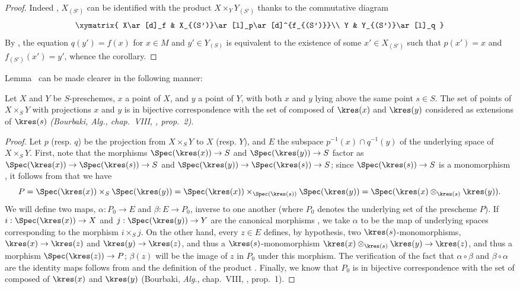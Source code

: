 \begin{proof}
Indeed , $X_{(S')}$ can be identified with the product $X\times_Y Y_{(S')}$ thanks to the commutative diagram
\[
  \xymatrix{
    X\ar[d]_f &
    X_{(S')}\ar[l]_p\ar[d]^{f_{(S')}}\\
    Y &
    Y_{(S')}\ar[l]_q
  }
\]
By , the equation $q(y')=f(x)$ for $x\in M$ and $y'\in Y_{(S)}$ is equivalent to the existence of some $x'\in X_{(S')}$ such that $p(x')=x$ and $f_{(S')}(x')=y'$, whence the corollary.
\end{proof}

Lemma~ can be made clearer in the following manner:
\begin{proposition}[3.4.9]
\label{I.3.4.9}
Let $X$ and $Y$ be $S$-preschemes, $x$ a point of $X$, and $y$ a point of $Y$, with both $x$ and $y$ lying above the same point $s\in S$.
The set of points of $X\times_S Y$ with projections $x$ and $y$ is in bijective correspondence with the set of  composed of $\kres(x)$ and $\kres(y)$ considered as extensions of $\kres(s)$ \emph{(Bourbaki, \emph{Alg.}, chap.~VIII, , prop.~2)}.
\end{proposition}

\begin{proof}
Let $p$ (resp. $q$) be the projection from $X\times_S Y$ to $X$ (resp. $Y$), and $E$ the subspace $p^{-1}(x)\cap q^{-1}(y)$ of the underlying space of $X\times_S Y$.
First, note that the morphisms $\Spec(\kres(x))\to S$ and $\Spec(\kres(y))\to S$ factor as $\Spec(\kres(x))\to\Spec(\kres(s))\to S$ and $\Spec(\kres(y))\to\Spec(\kres(s))\to S$; since $\Spec(\kres(s))\to S$ is a monomorphism , it follows from  that we have
\[
  P=\Spec(\kres(x))\times_S\Spec(\kres(y))=\Spec(\kres(x))\times_{\Spec(\kres(s))}\Spec(\kres(y))=\Spec(\kres(x)\otimes_{\kres(s)}\kres(y)).
\]
We will define two maps, $\alpha:P_0\to E$ and $\beta:E\to P_0$, inverse to one another (where $P_0$ denotes the underlying set of the prescheme $P$).
If $i:\Spec(\kres(x))\to X$ and $j:\Spec(\kres(y))\to Y$ are the canonical morphisms , we take $\alpha$ to be the map of underlying spaces corresponding to the morphism $i\times_S j$.
On the other hand, every $z\in E$ defines, by hypothesis, two $\kres(s)$-monomorphisms, $\kres(x)\to\kres(z)$ and $\kres(y)\to\kres(z)$, and thus a $\kres(s)$-monomorphism $\kres(x)\otimes_{\kres(s)}\kres(y)\to\kres(z)$, and thus a morphism $\Spec(\kres(z))\to P$; $\beta(z)$ will be the image of $z$ in $P_0$ under this morphism.
The verification of the fact that $\alpha\circ\beta$ and $\beta\circ\alpha$ are the identity maps follows from  and the definition of the product .
Finally, we know that $P_0$ is in bijective correspondence with the set of  composed of $\kres(x)$ and $\kres(y)$ (Bourbaki, \emph{Alg.}, chap.~VIII, , prop.~1).
\end{proof}

